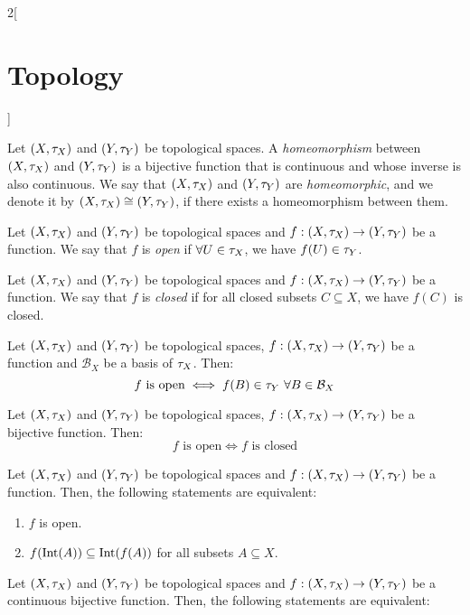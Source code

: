 \documentclass[../../../main.tex]{subfiles}
\begin{document}
\begin{multicols}{2}[\section{Topology}]
\begin{prop}
    \end{prop}
    \begin{definition}
        Let $(X,\tau_X)$ and $(Y,\tau_Y)$ be topological spaces. A \emph{homeomorphism} between $(X,\tau_X)$ and $(Y,\tau_Y)$ is a bijective function that is continuous and whose inverse is also continuous. We say that $(X,\tau_X)$ and $(Y,\tau_Y)$ are \emph{homeomorphic}, and we denote it by $(X,\tau_X)\cong(Y,\tau_Y)$, if there exists a homeomorphism between them.
    \end{definition}
    \begin{definition}
        Let $(X,\tau_X)$ and $(Y,\tau_Y)$ be topological spaces and $f:(X,\tau_X)\rightarrow (Y,\tau_Y)$ be a function. We say that $f$ is \emph{open} if $\forall U\in\tau_X$, we have $f(U)\in \tau_Y$.
    \end{definition}
    \begin{definition}
        Let $(X,\tau_X)$ and $(Y,\tau_Y)$ be topological spaces and $f:(X,\tau_X)\rightarrow (Y,\tau_Y)$ be a function. We say that $f$ is \emph{closed} if for all closed subsets $C\subseteq X$, we have $f(C)$ is closed.
    \end{definition}
    \begin{theorem}
        Let $(X,\tau_X)$ and $(Y,\tau_Y)$ be topological spaces, $f:(X,\tau_X)\rightarrow (Y,\tau_Y)$ be a function and $\mathcal{B}_X$ be a basis of $\tau_X$. Then: $$f\text{ is open}\iff f(B)\in\tau_Y\ \forall B\in \mathcal{B}_X$$
    \end{theorem}
    \begin{theorem}
        Let $(X,\tau_X)$ and $(Y,\tau_Y)$ be topological spaces, $f:(X,\tau_X)\rightarrow (Y,\tau_Y)$ be a bijective function. Then: $$f\text{ is open}\iff f\text{ is closed}$$
    \end{theorem}
    \begin{prop}
        Let $(X,\tau_X)$ and $(Y,\tau_Y)$ be topological spaces and $f:(X,\tau_X)\rightarrow (Y,\tau_Y)$ be a function. Then, the following statements are equivalent:
        \begin{enumerate}
            \item $f$ is open.
            \item $f(\operatorname{Int}(A))\subseteq \operatorname{Int}(f(A))$ for all subsets $A\subseteq X$.
        \end{enumerate}
    \end{prop}
    \begin{prop}
        Let $(X,\tau_X)$ and $(Y,\tau_Y)$ be topological spaces and $f:(X,\tau_X)\rightarrow (Y,\tau_Y)$ be a continuous bijective function. Then, the following statements are equivalent:

\end{prop}
\end{multicols}
\end{document}

